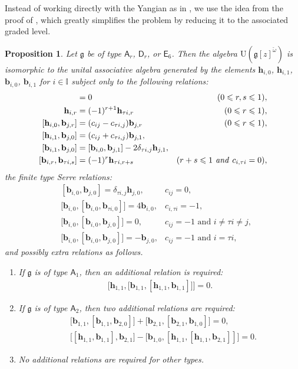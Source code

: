 \documentclass[11pt,reqno]{amsart}
\numberwithin{equation}{section}
\newtheorem{prop}[thm]{Proposition}
\theoremstyle{definition}
\theoremstyle{remark}
\newcommand{\bb}{\mathbf{b}}
\newcommand{\bh}{\mathbf{h}}
\newcommand{\g}{\mathfrak{g}}
\newcommand{\lle}{\leqslant}
\newcommand{\I}{{\mathbb I}}
\begin{document}
Instead of working directly with the Yangian as in \cite{Lev93gen,GNW18}, we use the idea from the proof of \cite[Theorem~4.14]{LWZ25affine}, which greatly simplifies the problem by reducing it to the associated graded level.

\begin{prop}\label{prop:red}
Let $\g$ be of type $\mathsf A_{r}$, $\mathsf D_r$, or $\mathsf E_6$. Then the algebra $\mathrm{U}(\g[z]^{\check\omega})$ is isomorphic to the unital associative algebra generated by the elements $\bh_{i,0}$, $\bh_{i,1}$, $\bb_{i,0}$,  $\bb_{i,1}$ for $i\in\I$ subject only to the following relations:
\begin{align}
[\bh_{i,r},\bh_{j,s}]&=0&(0\lle r,s\lle 1),\label{tchh}\\
\bh_{i,r}&=(-1)^{r+1}\bh_{\tau i,r} & (0\lle r\lle 1),\label{tch-sym}\\
[\bh_{i,0},\bb_{j,r}]&=(c_{ij}-c_{\tau i,j})\bb_{j,r}& (0\lle r\lle 1),\label{tch0b}\\
[\bh_{i,1},\bb_{j,0}]&=(c_{ij}+c_{\tau i,j})\bb_{j,1},\label{tch1b}\\
[\bb_{i,1},\bb_{j,0}]&=[\bb_{i,0},\bb_{j,1}]-2\delta_{\tau i,j}\bh_{j,1},\label{tcbb}\\
[\bb_{i,r},\bb_{\tau i,s}]&=(-1)^{r}\bh_{\tau i,r+s} &(r+s\lle 1 \text{\emph{ and }} c_{i,\tau i}=0),\label{tcbb2}
\end{align}
the finite type Serre relations: 
\begin{align}
&[\bb_{i,0},\bb_{j,0}]=\delta_{\tau i, j}\bh_{j,0}, &c_{ij}=0,\label{tcfSerre0}
\\
&\big[\bb_{i,0},[\bb_{i,0},\bb_{\tau i,0}]\big]  
= 4\bb_{i,0}, &c_{i,\tau i}=-1,\label{tcfSerre1}\\
&\big[\bb_{i,0},[\bb_{i,0},\bb_{j,0}]\big] =0, & c_{ij}=-1 \text{ and }i\ne \tau i\ne j, \label{tcfSerre2}\\
&\big[\bb_{i,0},[\bb_{i,0},\bb_{j,0}]\big] =-\bb_{j,0}, & c_{ij}=-1 \text{ and }i=\tau i,\label{tcfSerre3}
\end{align}
and possibly extra relations as follows.
\begin{enumerate}
\item If $\g$ is of type $\mathsf A_1$, then an additional relation is required:
\begin{align}
\big[\bh_{1,1},\big[\bb_{1,1},[\bh_{1,1},\bb_{1,1}]\big]\big]=0.\label{eq:extraA1-gr}
\end{align}
\item If $\g$ is of type $\mathsf A_2$, then two additional relations are required:
\begin{align}
&
\big[\bb_{1,1},[\bb_{1,1},\bb_{2,0}]\big]
+
\big[\bb_{2,1},[\bb_{2,1},\bb_{1,0}]\big]
=0,
\label{eq:A2-extra-Serre}
\\
&
\big[[\bh_{1,1},\bb_{1,1}],\bb_{2,1}\big]
-
\big[\bb_{1,0},
[\bh_{1,1},[\bh_{1,1},\bb_{2,1}]]
\big]
=0.
\label{eq:A2-extra-Cartan}
\end{align}
\item No additional relations are required for other types.
\end{enumerate}
\end{prop}
\end{document}
